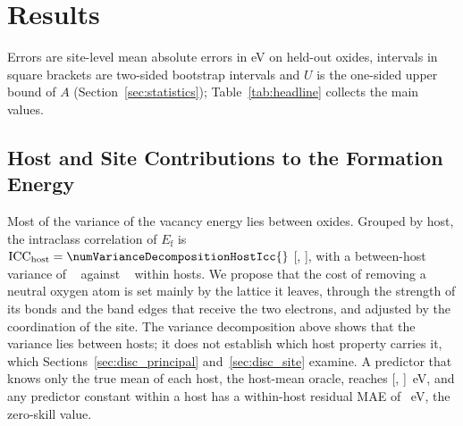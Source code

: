 \section{Results}
\label{sec:results}

Errors are site-level mean absolute errors in eV on held-out oxides, intervals in square brackets are two-sided \pctci{} bootstrap intervals and $U$ is the one-sided upper bound of $A$ (Section~\ref{sec:statistics}); Table~\ref{tab:headline} collects the main values.

\subsection{Host and Site Contributions to the Formation Energy}
\label{sec:host_site}

Most of the variance of the vacancy energy lies between oxides. Grouped by host, the intraclass correlation of $E_\mathrm{f}$ \citep{Shrout1979intraclass} is $\mathrm{ICC}_\mathrm{host} = \numVarianceDecompositionHostIcc{}$ [\numVarianceDecompositionHostIccCiLo{}, \numVarianceDecompositionHostIccCiHi{}], with a between-host variance of \numVarianceDecompositionHostSigmaTwoBetween{}~\eVsq{} against \numVarianceDecompositionHostSigmaTwoWithin{}~\eVsq{} within hosts. We propose that the cost of removing a neutral oxygen atom is set mainly by the lattice it leaves, through the strength of its bonds and the band edges that receive the two electrons, and adjusted by the coordination of the site. The variance decomposition above shows that the variance lies between hosts; it does not establish which host property carries it, which Sections~\ref{sec:disc_principal} and~\ref{sec:disc_site} examine. A predictor that knows only the true mean of each host, the host-mean oracle, reaches \numHostMeanOracleAggregateMaeMean{} [\numHostMeanOracleAggregateMaeCiLo{}, \numHostMeanOracleAggregateMaeCiHi{}]~eV, and any predictor constant within a host has a within-host residual MAE of \numHostMeanOracleAggregateWithinHostMaeMean{}~eV, the zero-skill value.

